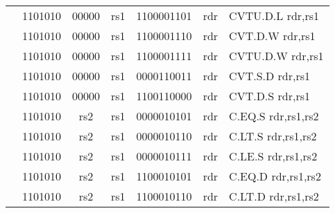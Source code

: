 \begin{table}[p]
\begin{small}
\begin{center}
\begin{tabular}{rcccccccccl}
&
\multicolumn{2}{|c|}{1101010} &
\multicolumn{1}{c|}{00000} &
\multicolumn{1}{c|}{rs1} &
\multicolumn{4}{c|}{1100001101} &
\multicolumn{1}{c|}{rdr} & CVTU.D.L rdr,rs1 \\
\cline{2-10}
  

&
\multicolumn{2}{|c|}{1101010} &
\multicolumn{1}{c|}{00000} &
\multicolumn{1}{c|}{rs1} &
\multicolumn{4}{c|}{1100001110} &
\multicolumn{1}{c|}{rdr} & CVT.D.W rdr,rs1 \\
\cline{2-10}
  

&
\multicolumn{2}{|c|}{1101010} &
\multicolumn{1}{c|}{00000} &
\multicolumn{1}{c|}{rs1} &
\multicolumn{4}{c|}{1100001111} &
\multicolumn{1}{c|}{rdr} & CVTU.D.W rdr,rs1 \\
\cline{2-10}
  

&
\multicolumn{2}{|c|}{1101010} &
\multicolumn{1}{c|}{00000} &
\multicolumn{1}{c|}{rs1} &
\multicolumn{4}{c|}{0000110011} &
\multicolumn{1}{c|}{rdr} & CVT.S.D rdr,rs1 \\
\cline{2-10}
  

&
\multicolumn{2}{|c|}{1101010} &
\multicolumn{1}{c|}{00000} &
\multicolumn{1}{c|}{rs1} &
\multicolumn{4}{c|}{1100110000} &
\multicolumn{1}{c|}{rdr} & CVT.D.S rdr,rs1 \\
\cline{2-10}
  

&
\multicolumn{2}{|c|}{1101010} &
\multicolumn{1}{c|}{rs2} &
\multicolumn{1}{c|}{rs1} &
\multicolumn{4}{c|}{0000010101} &
\multicolumn{1}{c|}{rdr} & C.EQ.S rdr,rs1,rs2 \\
\cline{2-10}
  

&
\multicolumn{2}{|c|}{1101010} &
\multicolumn{1}{c|}{rs2} &
\multicolumn{1}{c|}{rs1} &
\multicolumn{4}{c|}{0000010110} &
\multicolumn{1}{c|}{rdr} & C.LT.S rdr,rs1,rs2 \\
\cline{2-10}
  

&
\multicolumn{2}{|c|}{1101010} &
\multicolumn{1}{c|}{rs2} &
\multicolumn{1}{c|}{rs1} &
\multicolumn{4}{c|}{0000010111} &
\multicolumn{1}{c|}{rdr} & C.LE.S rdr,rs1,rs2 \\
\cline{2-10}
  

&
\multicolumn{2}{|c|}{1101010} &
\multicolumn{1}{c|}{rs2} &
\multicolumn{1}{c|}{rs1} &
\multicolumn{4}{c|}{1100010101} &
\multicolumn{1}{c|}{rdr} & C.EQ.D rdr,rs1,rs2 \\
\cline{2-10}
  

&
\multicolumn{2}{|c|}{1101010} &
\multicolumn{1}{c|}{rs2} &
\multicolumn{1}{c|}{rs1} &
\multicolumn{4}{c|}{1100010110} &
\multicolumn{1}{c|}{rdr} & C.LT.D rdr,rs1,rs2 \\
\cline{2-10}
  


\end{tabular}
\end{center}
\end{small}
\end{table}
